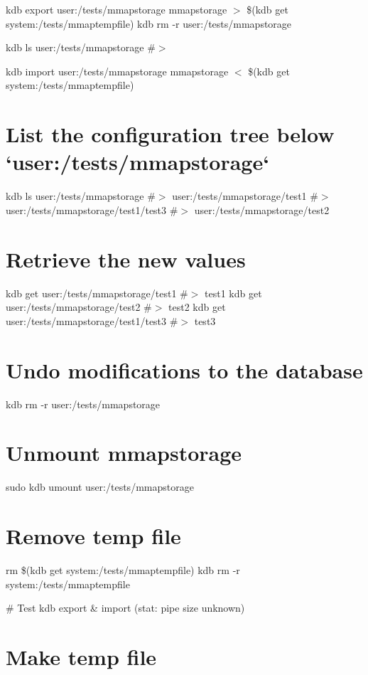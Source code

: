 kdb export user\+:/tests/mmapstorage mmapstorage $>$ \$(kdb get system\+:/tests/mmaptempfile) kdb rm -\/r user\+:/tests/mmapstorage

kdb ls user\+:/tests/mmapstorage \#$>$

kdb import user\+:/tests/mmapstorage mmapstorage $<$ \$(kdb get system\+:/tests/mmaptempfile)\hypertarget{autotoc_md411_autotoc_md418}{}\section{List the configuration tree below `user\+:/tests/mmapstorage`}\label{autotoc_md411_autotoc_md418}
kdb ls user\+:/tests/mmapstorage \#$>$ user\+:/tests/mmapstorage/test1 \#$>$ user\+:/tests/mmapstorage/test1/test3 \#$>$ user\+:/tests/mmapstorage/test2\hypertarget{autotoc_md411_autotoc_md419}{}\section{Retrieve the new values}\label{autotoc_md411_autotoc_md419}
kdb get user\+:/tests/mmapstorage/test1 \#$>$ test1 kdb get user\+:/tests/mmapstorage/test2 \#$>$ test2 kdb get user\+:/tests/mmapstorage/test1/test3 \#$>$ test3\hypertarget{autotoc_md411_autotoc_md420}{}\section{Undo modifications to the database}\label{autotoc_md411_autotoc_md420}
kdb rm -\/r user\+:/tests/mmapstorage\hypertarget{autotoc_md411_autotoc_md421}{}\section{Unmount mmapstorage}\label{autotoc_md411_autotoc_md421}
sudo kdb umount user\+:/tests/mmapstorage\hypertarget{autotoc_md411_autotoc_md422}{}\section{Remove temp file}\label{autotoc_md411_autotoc_md422}
rm \$(kdb get system\+:/tests/mmaptempfile) kdb rm -\/r system\+:/tests/mmaptempfile 
\begin{DoxyCode}
# Test kdb export & import (stat: pipe size unknown)
\end{DoxyCode}
 \hypertarget{autotoc_md411_autotoc_md423}{}\section{Make temp file}\label{autotoc_md411_autotoc_md423}
